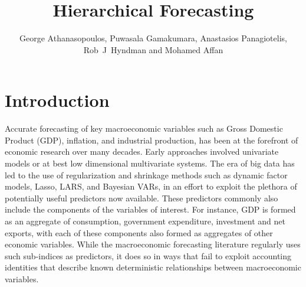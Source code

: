 \documentclass[graybox]{svmult}
\begin{document}
\title*{Hierarchical Forecasting}
\author{George Athanasopoulos, Puwasala Gamakumara, Anastasios Panagiotelis, Rob~J~Hyndman and Mohamed Affan}
%
%
\maketitle

\section{Introduction}\label{sec:intro}

Accurate forecasting of key macroeconomic variables such as Gross Domestic Product (GDP), inflation, and industrial production, has been at the forefront of economic research over many decades. Early approaches involved univariate models or at best low dimensional multivariate systems. The era of big data has led to the use of regularization and shrinkage methods such as dynamic factor models, Lasso, LARS, and Bayesian VARs, in an effort to exploit the plethora of potentially useful predictors now available. These predictors commonly also include the components of the variables of interest. For instance, GDP is formed as an aggregate of consumption, government expenditure, investment and net exports, with each of these components also formed as aggregates of other economic variables. While the macroeconomic forecasting literature regularly uses such sub-indices as predictors, it does so in ways that fail to exploit accounting identities that describe known deterministic relationships between macroeconomic variables.
\end{document}
